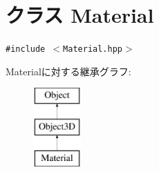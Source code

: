 \hypertarget{classm3g_1_1Material}{
\section{クラス Material}
\label{classm3g_1_1Material}
}
{\tt \#include $<$Material.hpp$>$}

Materialに対する継承グラフ:\begin{figure}[H]
\begin{center}
\leavevmode
\includegraphics[height=3cm]{classm3g_1_1Material}
\end{center}
\end{figure}

